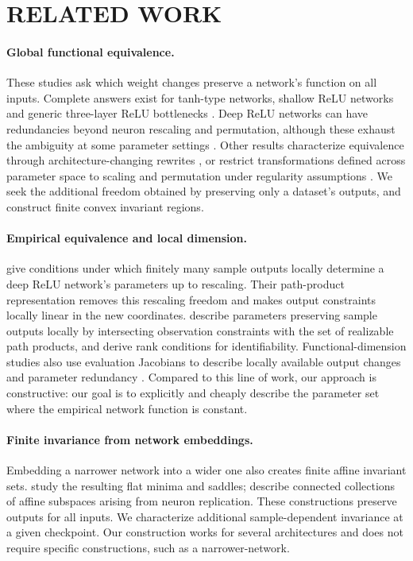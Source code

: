 \documentclass[twoside]{article}
\theoremstyle{remark}
\theoremstyle{highlightdefinition}
\theoremstyle{remark}
\begin{document}
\section{RELATED WORK}
\label{sec:related}

\paragraph{Global functional equivalence.}
These studies ask which weight changes preserve a network's function on all inputs. Complete answers exist for tanh-type networks, shallow ReLU networks and generic three-layer ReLU bottlenecks \citep{vlacic2020affine,ramakrishnan2026complete,gegenfurtner2026symmetries}. Deep ReLU networks can have redundancies beyond neuron rescaling and permutation, although these exhaust the ambiguity at some parameter settings \citep{grigsby2023hidden,grillo2026identifiable}. Other results characterize equivalence through architecture-changing rewrites \citep{zhang2026identification}, or restrict transformations defined across parameter space to scaling and permutation under regularity assumptions \citep{deng2026covering}. We seek the additional freedom obtained by preserving only a dataset's outputs, and construct finite convex invariant regions.

\paragraph{Empirical equivalence and local dimension.}
\citet{stock2021embedding} give conditions under which finitely many sample outputs locally determine a deep ReLU network's parameters up to rescaling. Their path-product representation removes this rescaling freedom and makes output constraints locally linear in the new coordinates.
\citet{bonapellissier2022local} describe parameters preserving sample outputs locally by intersecting observation constraints with the set of realizable path products, and derive rank conditions for identifiability. Functional-dimension studies also use evaluation Jacobians to describe locally available output changes and parameter redundancy \citep{grigsby2025functional,bonapellissier2024geometry}. Compared to this line of work, our approach is constructive: our goal is to explicitly and cheaply describe the parameter set where the empirical network function is constant.

\paragraph{Finite invariance from network embeddings.}
Embedding a narrower network into a wider one also creates finite affine invariant sets. \citet{fukumizu2019semiflat} study the resulting flat minima and saddles; \citet{simsek2021geometry} describe connected collections of affine subspaces arising from neuron replication. These constructions preserve outputs for all inputs. We characterize additional sample-dependent invariance at a given checkpoint. Our construction works for several architectures and does not require specific constructions, such as a narrower-network.
\end{document}
